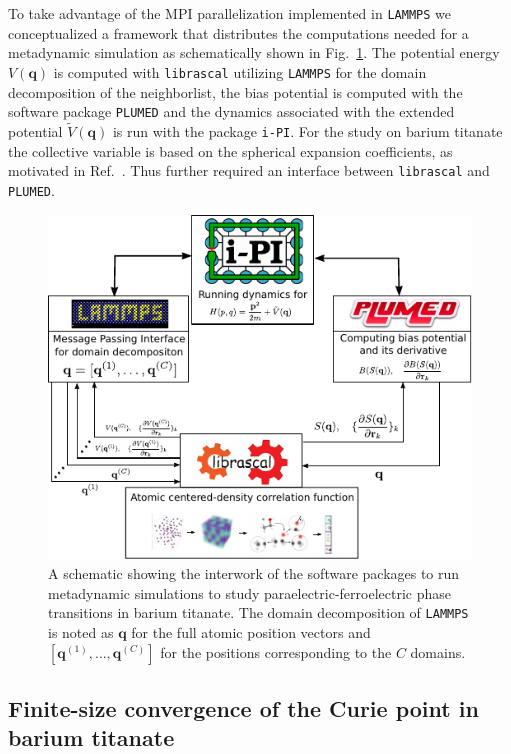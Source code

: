 To take advantage of the MPI parallelization implemented in \texttt{LAMMPS} we conceptualized a framework that distributes the computations needed for a metadynamic simulation as schematically shown in Fig.~\ref{fig:ipi-librascal-plumed}.
The potential energy $V(\mathbf{q})$ is computed with \texttt{librascal} utilizing \texttt{LAMMPS} for the domain decomposition of the neighborlist, the bias potential is computed with the software package \texttt{PLUMED} and the dynamics associated with the extended potential $\tilde{V}(\mathbf{q})$ is run with the package \texttt{i-PI}.
For the study on barium titanate the collective variable is based on the spherical expansion coefficients, as motivated in Ref.~\cite{gigli2022thermodynamics}.
Thus further required an interface between \texttt{librascal} and \texttt{PLUMED}.

\begin{figure}
    \includegraphics[width=\textwidth]{fig/ipi-librascal-plumed.pdf}
    \caption{A schematic showing the interwork of the software packages to run metadynamic simulations to study paraelectric-ferroelectric phase transitions in barium titanate. The domain decomposition of \texttt{LAMMPS} is noted as $\mathbf{q}$ for the full atomic position vectors and $[\mathbf{q}^{(1)},\ldots, \mathbf{q}^{(C)}]$ for the positions corresponding to the $C$ domains.} 
    \label{fig:ipi-librascal-plumed}
\end{figure}

\subsection{Finite-size convergence of the Curie point in barium titanate}

